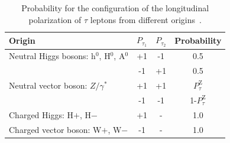 \documentclass[12pt]{article}
\def\Tau{\ensuremath{\tau}\xspace}
\def\PTAUZ{\ensuremath{P_{\tau}^{\mathrm{Z}}}\xspace}
\def\ZGAMMA{\ensuremath{Z/\gamma^{*}}\xspace}
\begin{document}
\begin{table}
\begin{center}
\begin{tabular}{|l|c|c|c|}
\hline \hline
Origin & $P_{\tau_1}$ & $P_{\tau_2}$ &Probability\\
   \hline
Neutral Higgs bosons: h$^{0}$, H$^{0}$, A$^{0}$ &
+1 & -1&0.5\\
& -1 & +1&0.5\\
\hline
Neutral vector boson: \ZGAMMA&
+1 & +1&\PTAUZ\\
& -1 & -1&1-\PTAUZ\\
\hline
Charged Higgs: H${+}$, H${-}$&
+1 & - &1.0\\
\hline
Charged vector boson: W${+}$, W${-}$&
-1 & - &1.0\\
   \hline \hline
  \end{tabular}
 \caption{Probability for the configuration of the longitudinal
  polarization of \Tau leptons from different origins~\cite{TauSpinERWZW}. }
 \label{tab:SpinConf}
 \end{center}
\end{table}
\end{document}
